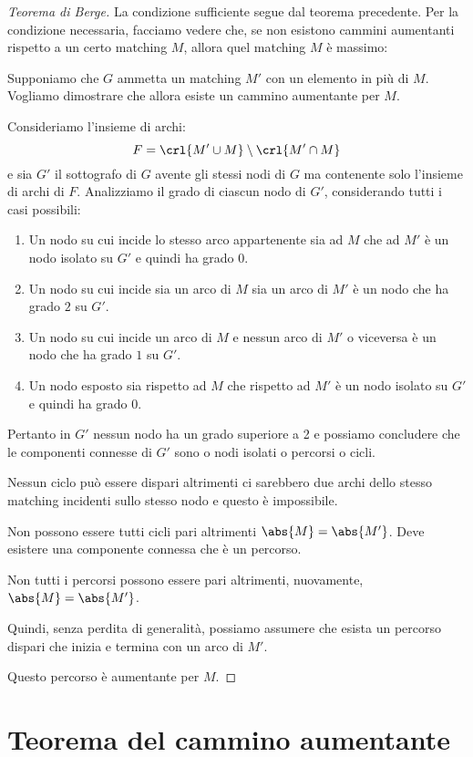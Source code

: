\documentclass[\main/main.tex]{subfiles}
\begin{document}
\begin{proof}[Teorema di Berge]
	La condizione sufficiente segue dal teorema precedente. Per la condizione necessaria, facciamo vedere che, se non esistono cammini aumentanti rispetto a un certo matching \(M\), allora quel matching \(M\) è massimo:

	Supponiamo che \(G\) ammetta un matching \(M'\) con un elemento in più di \(M\). Vogliamo dimostrare che allora esiste un cammino aumentante per \(M\).

	Consideriamo l'insieme di archi:
	\[
		F = \crl{M'\cup M}\setminus\crl{M' \cap M}
	\]
	e sia \(G'\) il sottografo di \(G\) avente gli stessi nodi di \(G\) ma contenente solo l'insieme di archi di \(F\). Analizziamo il grado di ciascun nodo di \(G'\), considerando tutti i casi possibili:
	\begin{enumerate}
		\item Un nodo su cui incide lo stesso arco appartenente sia ad \(M\) che ad \(M'\) è un nodo isolato su \(G'\) e quindi ha grado 0.
		\item Un nodo su cui incide sia un arco di \(M\) sia un arco di \(M'\) è un nodo che ha grado \(2\) su \(G'\).
		\item Un nodo su cui incide un arco di \(M\) e nessun arco di \(M'\) o viceversa è un nodo che ha grado \(1\) su \(G'\).
		\item Un nodo esposto sia rispetto ad \(M\) che rispetto ad \(M'\) è un nodo isolato su \(G'\) e quindi ha grado 0.
	\end{enumerate}
	Pertanto in \(G'\) nessun nodo ha un grado superiore a 2 e possiamo concludere che le componenti connesse di \(G'\) sono o nodi isolati o percorsi o cicli.

	Nessun ciclo può essere dispari altrimenti ci sarebbero due archi dello stesso matching incidenti sullo stesso nodo e questo è impossibile.

	Non possono essere tutti cicli pari altrimenti \(\abs{M} = \abs{M'}\). Deve esistere una componente connessa che è un percorso.

	Non tutti i percorsi possono essere pari altrimenti, nuovamente, \(\abs{M} = \abs{M'}\).

	Quindi, senza perdita di generalità, possiamo assumere che esista un percorso dispari che inizia e termina con un arco di \(M'\).

	Questo percorso è aumentante per \(M\).
\end{proof}
\clearpage
\section{Teorema del cammino aumentante}
\end{document}

